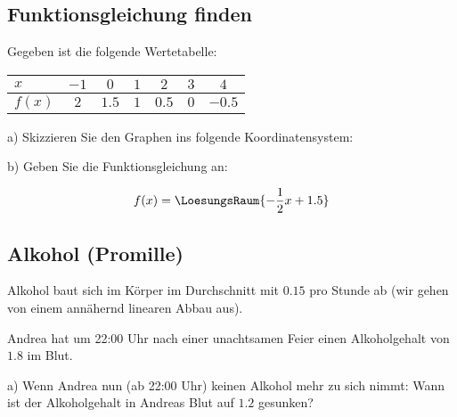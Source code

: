 
\subsection{Funktionsgleichung finden}
Gegeben ist die folgende Wertetabelle:

\begin{tabular}{l|c|c|c|c|c|c|}
$x$    & $-1$ & $0$   & $1$ & $2$   & $3$ & $4$ \\\hline
$f(x)$ & $2$  & $1.5$ & $1$ & $0.5$ & $0$ & $-0.5$ \\
\end{tabular}

a) Skizzieren Sie den Graphen ins folgende Koordinatensystem:


b) Geben Sie die Funktionsgleichung an:

$$f(x) = \LoesungsRaum{-\frac12x+1.5}$$
\TNTeop{}
\subsection{Alkohol (Promille)}
Alkohol baut sich im Körper im Durchschnitt mit
$0.15$\textperthousand{} pro Stunde ab (wir gehen von einem annähernd
linearen Abbau aus).

Andrea hat um 22:00 Uhr nach einer unachtsamen Feier einen
Alkoholgehalt von $1.8$\textperthousand{} im Blut.

a) Wenn Andrea nun (ab 22:00 Uhr) keinen Alkohol mehr zu sich nimmt:
Wann ist der Alkoholgehalt in Andreas Blut auf $1.2$\textperthousand{}
gesunken?


